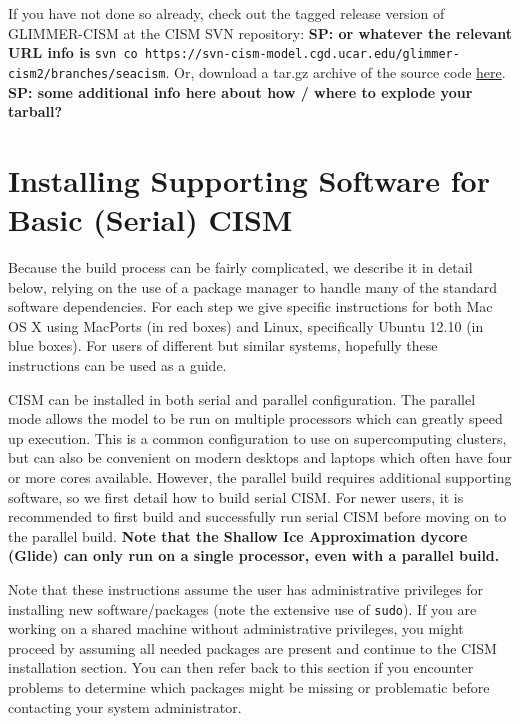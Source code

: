 If you have not done so already, check out the tagged release version of GLIMMER-CISM at the CISM SVN repository: \textbf{SP: or whatever the relevant URL info is} \texttt{svn co https://svn-cism-model.cgd.ucar.edu/glimmer-cism2/branches/seacism}. Or, download a tar.gz archive of the source code \href{some-other-link.html}{here}. \textbf{SP: some additional info here about how / where to explode your tarball?}



\section{Installing Supporting Software for Basic (Serial) CISM}

Because the build process can be fairly complicated, we describe it in detail below, 
relying on the use of a package manager to handle many of the standard software dependencies. 
For each step we give specific instructions for both Mac OS X using MacPorts (in red boxes) and
Linux, specifically Ubuntu 12.10 (in blue boxes).  For users of different but similar systems,
hopefully these instructions can be used as a guide.

CISM can be installed in both serial and parallel configuration.  The parallel mode
allows the model to be run on multiple processors which can greatly speed up execution.
This is a common configuration to use on supercomputing clusters, but can also be 
convenient on modern desktops and laptops which often have four or more cores available.
However, the parallel build requires additional supporting software, so we first 
detail how to build serial CISM.  For newer users, it is recommended to first build
and successfully run serial CISM before moving on to the parallel build.  \textbf{Note
that the Shallow Ice Approximation dycore (Glide) can only run on a single processor, 
even with a parallel build.}

Note that these instructions assume the user has administrative privileges for
installing new software/packages (note the extensive use of \texttt{sudo}).  
If you are working on a shared machine without
administrative privileges, you might proceed by assuming all needed packages are present and 
continue to the CISM installation section.  You can then refer back to this
section if you encounter problems to determine which packages might be missing or
problematic before contacting your system administrator.


